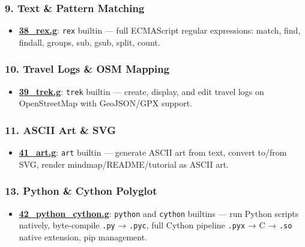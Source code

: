 \documentclass[
]{article}
\providecommand{\tightlist}{%
  \setlength{\itemsep}{0pt}\setlength{\parskip}{0pt}}
\begin{document}
\subsubsection{9. Text \& Pattern Matching}\label{text-pattern-matching}

\begin{itemize}
\tightlist
\item
  \textbf{\url{38_rex.g}}: \texttt{rex} builtin --- full ECMAScript
  regular expressions: match, find, findall, groups, sub, gsub, split,
  count.
\end{itemize}

\subsubsection{10. Travel Logs \& OSM
Mapping}\label{travel-logs-osm-mapping}

\begin{itemize}
\tightlist
\item
  \textbf{\url{39_trek.g}}: \texttt{trek} builtin --- create, display,
  and edit travel logs on OpenStreetMap with GeoJSON/GPX support.
\end{itemize}

\subsubsection{11. ASCII Art \& SVG}\label{ascii-art-svg}

\begin{itemize}
\tightlist
\item
  \textbf{\url{41_art.g}}: \texttt{art} builtin --- generate ASCII art
  from text, convert to/from SVG, render mindmap/README/tutorial as
  ASCII art.
\end{itemize}

\subsubsection{13. Python \& Cython
Polyglot}\label{python-cython-polyglot}

\begin{itemize}
\tightlist
\item
  \textbf{\url{42_python_cython.g}}: \texttt{python} and \texttt{cython}
  builtins --- run Python scripts natively, byte-compile \texttt{.py} →
  \texttt{.pyc}, full Cython pipeline \texttt{.pyx} → C → \texttt{.so}
  native extension, pip management.
\end{itemize}
\end{document}
